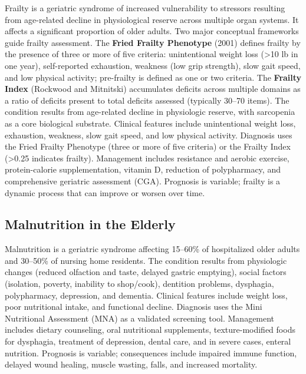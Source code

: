 Frailty is a geriatric syndrome of increased vulnerability to stressors resulting from age-related decline in physiological reserve across multiple organ systems. It affects a significant proportion of older adults. Two major conceptual frameworks guide frailty assessment. The \textbf{Fried Frailty Phenotype} (2001) defines frailty by the presence of three or more of five criteria: unintentional weight loss (>10 lb in one year), self-reported exhaustion, weakness (low grip strength), slow gait speed, and low physical activity; pre-frailty is defined as one or two criteria. The \textbf{Frailty Index} (Rockwood and Mitnitski) accumulates deficits across multiple domains as a ratio of deficits present to total deficits assessed (typically 30--70 items). The condition results from age-related decline in physiologic reserve, with sarcopenia as a core biological substrate. Clinical features include unintentional weight loss, exhaustion, weakness, slow gait speed, and low physical activity. Diagnosis uses the Fried Frailty Phenotype (three or more of five criteria) or the Frailty Index (>0.25 indicates frailty). Management includes resistance and aerobic exercise, protein-calorie supplementation, vitamin D, reduction of polypharmacy, and comprehensive geriatric assessment (CGA). Prognosis is variable; frailty is a dynamic process that can improve or worsen over time.

\subsection{Malnutrition in the Elderly}
\label{sec:Malnutrition in the Elderly}

Malnutrition is a geriatric syndrome affecting 15--60\% of hospitalized older adults and 30--50\% of nursing home residents. The condition results from physiologic changes (reduced olfaction and taste, delayed gastric emptying), social factors (isolation, poverty, inability to shop/cook), dentition problems, dysphagia, polypharmacy, depression, and dementia. Clinical features include weight loss, poor nutritional intake, and functional decline. Diagnosis uses the Mini Nutritional Assessment (MNA) as a validated screening tool. Management includes dietary counseling, oral nutritional supplements, texture-modified foods for dysphagia, treatment of depression, dental care, and in severe cases, enteral nutrition. Prognosis is variable; consequences include impaired immune function, delayed wound healing, muscle wasting, falls, and increased mortality.

